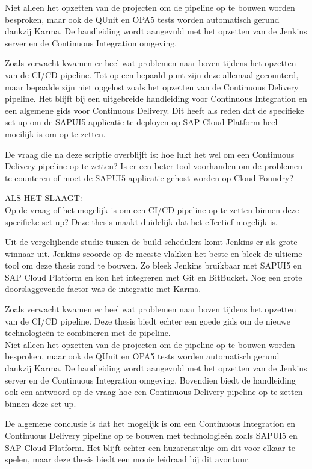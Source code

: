 Niet alleen het opzetten van de projecten om de pipeline op te bouwen worden besproken, maar ook de QUnit en OPA5 tests worden automatisch gerund dankzij Karma. De handleiding wordt aangevuld met het opzetten van de Jenkins server en de Continuous Integration omgeving.

Zoals verwacht kwamen er heel wat problemen naar boven tijdens het opzetten van de CI/CD pipeline. Tot op een bepaald punt zijn deze allemaal gecounterd, maar bepaalde zijn niet opgelost zoals het opzetten van de Continuous Delivery pipeline.
Het blijft bij een uitgebreide handleiding voor Continuous Integration en een algemene gids voor Continuous Delivery. Dit heeft als reden dat de specifieke set-up om de SAPUI5 applicatie te deployen op SAP Cloud Platform heel moeilijk is om op te zetten.

De vraag die na deze scriptie overblijft is: hoe lukt het wel om een Continuous Delivery pipeline op te zetten? Is er een beter tool voorhanden om de problemen te counteren of moet de SAPUI5 applicatie gehost worden op Cloud Foundry?

ALS HET SLAAGT:\\
Op de vraag of het mogelijk is om een CI/CD pipeline op te zetten binnen deze specifieke set-up? Deze thesis maakt duidelijk dat het effectief mogelijk is.

Uit de vergelijkende studie tussen de build schedulers komt Jenkins er als grote winnaar uit. Jenkins scoorde op de meeste vlakken het beste en bleek de ultieme tool om deze thesis rond te bouwen. Zo bleek Jenkins bruikbaar met SAPUI5 en SAP Cloud Platform en kon het integreren met Git en BitBucket. Nog een grote doorslaggevende factor was de integratie met Karma.

Zoals verwacht kwamen er heel wat problemen naar boven tijdens het opzetten van de CI/CD pipeline. Deze thesis biedt echter een goede gids om de nieuwe technologieën te combineren met de pipeline.\\
Niet alleen het opzetten van de projecten om de pipeline op te bouwen worden besproken, maar ook de QUnit en OPA5 tests worden automatisch gerund dankzij Karma. De handleiding wordt aangevuld met het opzetten van de Jenkins server en de Continuous Integration omgeving. Bovendien biedt de handleiding ook een antwoord op de vraag hoe een Continuous Delivery pipeline op te zetten binnen deze set-up.

De algemene conclusie is dat het mogelijk is om een Continuous Integration en Continuous Delivery pipeline op te bouwen met technologieën zoals SAPUI5 en SAP Cloud Platform. Het blijft echter een huzarenstukje om dit voor elkaar te spelen, maar deze thesis biedt een mooie leidraad bij dit avontuur.